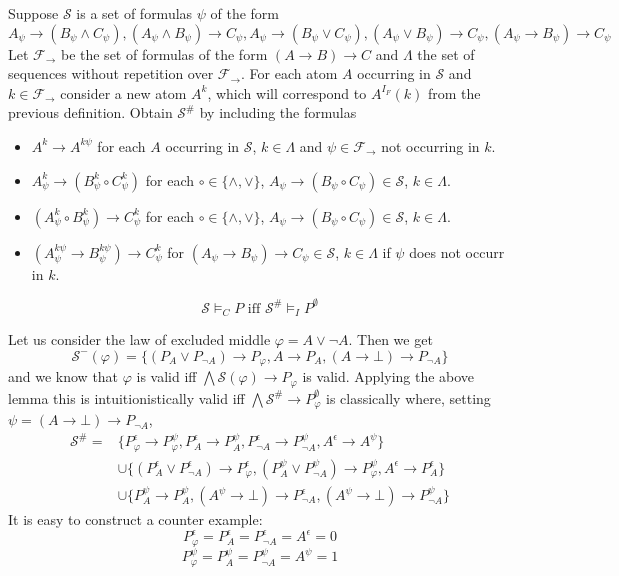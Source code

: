 \documentclass[a4paper,UKenglish,cleveref, autoref, thm-restate]{lipics-v2021}
\begin{document}
\begin{definition}
	Suppose $\mathcal S$ is a set of formulas $\psi$ of the form
	$$A_\psi\to (B_\psi\wedge C_\psi), (A_\psi\wedge B_\psi)\to C_\psi, A_\psi\to (B_\psi\vee C_\psi),(A_\psi\vee B_\psi)\to C_\psi, (A_\psi\to B_\psi)\to C_\psi$$
	Let $\mathcal F_\to$ be the set of formulas of the form $(A\to B)\to C$ and $\Lambda$ the set of sequences without repetition over $\mathcal F_\to$. For each atom $A$ occurring in $\mathcal S$ and $k\in \mathcal F_\to$ consider a new atom $A^{k}$, which will correspond to $A^{I_F}(k)$ from the previous definition. Obtain $\mathcal S^\#$ by including the formulas
	\begin{itemize}
		\item $A^k\to A^{k\psi}$ for each $A$ occurring in $\mathcal S$, $k\in\Lambda$ and $\psi\in\mathcal F_\to$ not occurring in $k$.
		\item $A^k_\psi\to (B^k_\psi\circ C^k_\psi)$ for each $\circ\in\{\wedge,\vee\}$, $A_\psi\to (B_\psi\circ C_\psi)\in\mathcal S$, $k\in\Lambda$.
		\item $(A^k_\psi\circ B^k_\psi)\to C^k_\psi$ for each $\circ\in\{\wedge,\vee\}$, $A_\psi\to (B_\psi\circ C_\psi)\in\mathcal S$, $k\in\Lambda$.
		\item $(A^{k\psi}_\psi\to B^{k\psi}_\psi)\to C^k_\psi$ for $(A_\psi\to B_\psi)\to C_\psi\in\mathcal S$, $k\in\Lambda$ if $\psi$ does not occurr in $k$.
	\end{itemize}
\end{definition}

\begin{theorem}
	$$\mathcal S\models_C P\text{ iff }\mathcal S^\#\models_I P^\emptyset$$
\end{theorem}

\begin{example}
	Let us consider the law of excluded middle $\varphi = A\vee\neg A$. Then we get
	$$\mathcal S^-(\varphi) = \{(P_A\vee P_{\neg A})\to P_\varphi, A\to P_A, (A\to \bot)\to P_{\neg A}\}$$
	and we know that $\varphi$ is valid iff $\bigwedge \mathcal S(\varphi)\to P_\varphi$ is valid. Applying the above lemma this is intuitionistically valid iff $\bigwedge\mathcal S^\#\to P^\emptyset_\varphi$ is classically where, setting $\psi = (A\to \bot)\to P_{\neg A}$,
	\begin{align*}
		\mathcal S^\# =&\{P_\varphi^\epsilon\to P_\varphi^{\psi}, P_A^\epsilon\to P_A^{\psi},P_{\neg A}^\epsilon\to P_{\neg A}^{\psi},A^\epsilon\to A^{\psi}\}\\ &\cup\{(P_A^\epsilon\vee P_{\neg A}^\epsilon)\to P_\varphi^\epsilon, (P_A^{\psi}\vee P_{\neg A}^{\psi})\to P_\varphi^{\psi},  A^\epsilon\to P_A^\epsilon\}\\ &\cup \{P_A^{\psi}\to P_A^{\psi}, (A^{\psi}\to \bot)\to P_{\neg A}^\epsilon, (A^{\psi}\to \bot)\to P_{\neg A}^{\psi}\}
	\end{align*}
	It is easy to construct a counter example:
	$$P_\varphi^\epsilon  = P_A^\epsilon = P_{\neg A}^\epsilon = A^\epsilon = 0$$
	$$P_{\varphi}^{\psi} = P_A^{\psi} =  P_{\neg A}^{\psi} = A^{\psi} = 1$$
\end{example}	
\end{document}
